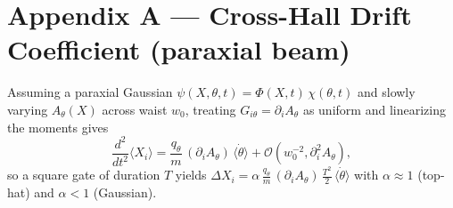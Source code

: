\section*{Appendix A --- Cross-Hall Drift Coefficient (paraxial beam)}\label{sec:appendix-a}
Assuming a paraxial Gaussian $\psi(X,\theta,t)=\Phi(X,t)\,\chi(\theta,t)$ and slowly varying $A_\theta(X)$ across waist $w_0$, treating $G_{i\theta}=\partial_iA_\theta$ as uniform and linearizing the moments gives
\begin{equation}
 \frac{d^2}{dt^2}\langle X_i\rangle = \frac{q_\theta}{m}\,(\partial_iA_\theta)\,\langle\dot\theta\rangle + \mathcal O(w_0^{-2},\partial_i^2A_\theta),
\end{equation}
so a square gate of duration $T$ yields $\Delta X_i = \alpha\,\frac{q_\theta}{m}\,(\partial_iA_\theta)\,\frac{T^2}{2}\,\langle\dot\theta\rangle$ with $\alpha\approx 1$ (top-hat) and $\alpha<1$ (Gaussian).

